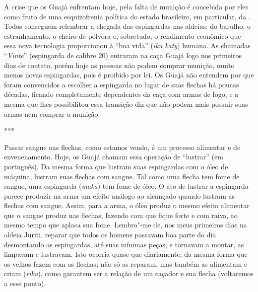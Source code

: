 A crise que os Guajá enfrentam hoje, pela falta de munição é concebida
por eles como fruto de uma esquizofrenia política do estado brasileiro,
em particular, da . Todos conseguem relembrar a chegada das
espingardas nas aldeias: do barulho, o estranhamento, o cheiro de
pólvora e, sobretudo, o rendimento econômico que essa nova tecnologia
proporcionou à ``boa vida'' (\emph{iku katy}) humana. As chamadas
``\emph{Vinte}'' (espingarda de calibre 20) entraram na caça Guajá logo
nos primeiros dias de contato, porém hoje as pessoas não podem comprar
munição, muito menos novas espingardas, pois é proibido por lei. Os
Guajá não entendem por que foram convencidos a escolher a espingarda no
lugar de suas flechas há poucas décadas, ficando completamente
dependentes da caça com armas de fogo, e a mesma  que lhes
possibilitou essa transição diz que não podem mais possuir suas armas
nem comprar a munição.

\begin{center}
***
\end{center}

Passar sangue nas flechas, como estamos vendo, é um processo alimentar e
de envenenamento. Hoje, os Guajá chamam essa operação de ``lustrar'' (em
português). Da mesma forma que lustram suas espingardas com o óleo de
máquina, lustram suas flechas com sangue. Tal como uma flecha tem fome
de sangue, uma espingarda (\emph{maka}) tem fome de óleo. O ato de
lustrar a espingarda parece produzir na arma um efeito análogo ao
alcançado quando lustram as flechas com sangue. Assim, para a arma, o
óleo produz o mesmo efeito alimentar que o sangue produz nas flechas,
fazendo com que fique forte e com raiva, ao mesmo tempo que aplaca sua
fome. Lembro"-me de, nos meus primeiros dias na aldeia Juriti, reparar
que todos os homens passavam boa parte do dia desmontando as
espingardas, até suas mínimas peças, e tornavam a montar, as limpavam e
lustravam. Isto ocorria quase que diariamente, da mesma forma que os
velhos fazem com as flechas; não só as reparam, mas também as alimentam
e criam (\emph{riku}), como garantem ser a relação de um caçador e sua
flecha (voltaremos a esse ponto).

